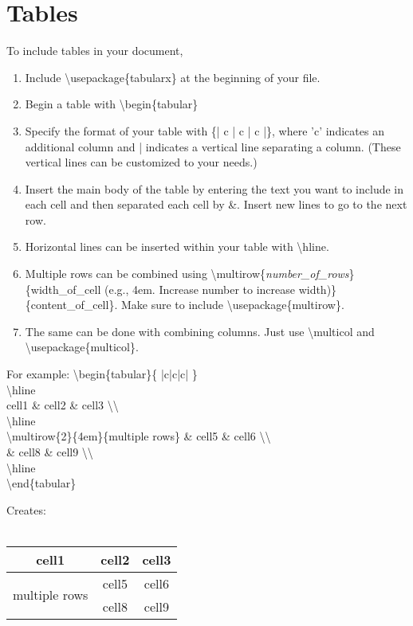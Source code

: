 \documentclass{article}
\begin{document}
\section*{Tables}
\par To include tables in your document,
\begin{enumerate}
    \item Include \textbackslash usepackage\{tabularx\} at the beginning of your file.
    \item Begin a table with \textbackslash begin\{tabular\}
    \item Specify the format of your table with \{| c | c | c |\}, where 'c' indicates an additional column and | indicates a vertical line separating a column. (These vertical lines can be customized to your needs.)
    \item Insert the main body of the table by entering the text you want to include in each cell and then separated each cell by \&. Insert new lines to go to the next row.
    \item Horizontal lines can be inserted within your table with \textbackslash hline.
    \item Multiple rows can be combined using \textbackslash multirow\{\textit{number\_of\_rows}\}\{width\_of\_cell (e.g., 4em. Increase number to increase width)\}\{content\_of\_cell\}. Make sure to include \textbackslash usepackage\{multirow\}.
    \item The same can be done with combining columns. Just use \textbackslash multicol and \textbackslash usepackage\{multicol\}.
\end{enumerate}
\par For example:
\newpage
\textbackslash begin\{tabular\}\{ |c|c|c| \} \\
\textbackslash hline \\
 cell1 \& cell2 \& cell3 \textbackslash\textbackslash \\
 \textbackslash hline \\
 
 \textbackslash multirow\{2\}\{4em\}\{multiple rows\} \& cell5 \& cell6 \textbackslash\textbackslash \\
 \& cell8 \& cell9 \textbackslash\textbackslash \\
 \textbackslash hline \\
\textbackslash end\{tabular\} \\
\par Creates: \\ \\
\begin{tabular}{ |c|c|c| } 
 \hline
 cell1 & cell2 & cell3 \\ 
 \hline
 \multirow{2}{4em}{multiple rows} & cell5 & cell6 \\
 & cell8 & cell9 \\
 \hline
\end{tabular}
\end{document}
